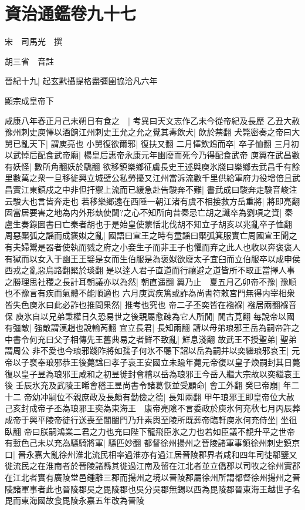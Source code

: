 \chapter{資治通鑑卷九十七}
宋　司馬光　撰

胡三省　音註

晉紀十九|{
	起玄黓攝提格盡彊圉協洽凡六年}


顯宗成皇帝下

咸康八年春正月己未朔日有食之　|{
	考異曰天文志作乙未今從帝紀及長歷}
乙丑大赦　豫州刺史庾懌以酒餉江州刺史王允之允之覺其毒飲犬|{
	飲於禁翻}
犬斃密奏之帝曰大舅已亂天下|{
	謂庾亮也}
小舅復欲爾邪|{
	復扶又翻}
二月懌飲鴆而卒|{
	卒子恤翻}
三月初以武悼后配食武帝廟|{
	楊皇后惠帝永康元年幽廢而死今乃得配食武帝}
庾翼在武昌數有妖怪|{
	數所角翻妖於驕翻}
欲移鎮樂鄉征虜長史王述與庾氷牋曰樂鄉去武昌千有餘里數萬之衆一旦移徙興立城壁公私勞擾又江州當泝流數千里供給軍府力役增倍且武昌實江東鎮戍之中非但扞禦上流而已緩急赴告駿奔不難|{
	書武成曰駿奔走駿音峻注云駿大也言皆奔走也}
若移樂鄉遠在西陲一朝江渚有虞不相接救方岳重將|{
	將即亮翻}
固當居要害之地為内外形埶使闚?之心不知所向昔秦忌亡胡之讖卒為劉項之資|{
	秦盧生奏錄圖書曰亡秦者胡也于是始皇使蒙恬北伐胡不知立子胡亥以兆亂卒子恤翻}
周惡檿弧之謡而成褒姒之亂|{
	國語曰宣王之時有童謡曰檿弧箕服實亡周國宣王聞之有夫婦鬻是器者使執而戮之府之小妾生子而非王子也懼而弃之此人也收以奔褒褒人有獄而以女入于幽王王嬖是女而生伯服是為褒姒欲廢太子宜臼而立伯服卒以成申侯西戎之亂惡烏路翻檿於琰翻}
是以逹人君子直道而行禳避之道皆所不取正當擇人事之勝理思社稷之長計耳朝議亦以為然|{
	朝直遥翻}
翼乃止　夏五月乙卯帝不豫|{
	豫順也不豫言有疾而氣體不能順適也}
六月庚寅疾篤或詐為尚書符敕宮門無得内宰相衆皆失色庾氷曰此必詐也推問果然|{
	推考也究也}
帝二子丕奕皆在襁褓|{
	襁居兩翻褓音保}
庾氷自以兄弟秉權日久恐易世之後親屬愈疎為它人所閒|{
	閒古莧翻}
每說帝以國有彊敵|{
	強敵謂漢趙也說輸芮翻}
宜立長君|{
	長知兩翻}
請以母弟琅邪王岳為嗣帝許之中書令何充曰父子相傳先王舊典易之者鮮不致亂|{
	鮮息淺翻}
故武王不授聖弟|{
	聖弟謂周公}
非不愛也今琅邪踐阼將如孺子何氷不聽下詔以岳為嗣并以奕繼琅邪哀王|{
	元帝以子裒奉琅邪恭王後薨諡曰孝子哀王安國立未踰年薨元帝復以皇子煥嗣封其日薨復以皇子昱為琅邪王咸和之初昱徙封會稽以岳為琅邪王今岳入繼大宗故以奕繼哀王後}
壬辰氷充及武陵王晞會稽王昱尚書令諸葛恢並受顧命|{
	會工外翻}
癸巳帝崩|{
	年二十二}
帝幼冲嗣位不親庶政及長頗有勤儉之德|{
	長知兩翻}
甲午琅邪王即皇帝位大赦己亥封成帝子丕為琅邪王奕為東海王　康帝亮隂不言委政於庾氷何充秋七月丙辰葬成帝于興平陵帝徒行送喪至閶闔門乃升素輿至陵所既葬帝臨軒庾氷何充侍坐|{
	坐徂臥翻}
帝曰朕嗣鴻業二君之力也充曰陛下龍飛臣氷之力也若如臣議不覩升平之世帝有慙色己未以充為驃騎將軍|{
	驃匹妙翻}
都督徐州揚州之晉陵諸軍事領徐州刺史鎮京口|{
	晉永嘉大亂徐州淮北流民相率過淮亦有過江居晉陵郡界者咸和四年司徒郗鑒又徙流民之在淮南者於晉陵諸縣其徙過江南及留在江北者並立僑郡以司牧之徐州實郡在江北者實有廣陵堂邑鍾離三郡而揚州之境以晉陵郡屬徐州所謂都督徐州揚州之晉陵諸軍事者此也晉陵郡吳之毘陵郡也吳分吳郡無錫以西為毘陵郡晉東海王越世子名毘而東海國故食毘陵永嘉五年改為晉陵}
